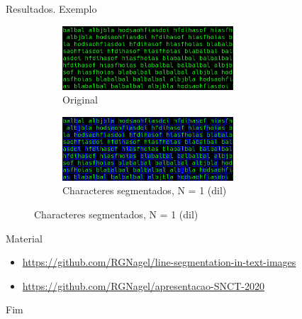 \documentclass{beamer}
\begin{document}
\begin{frame}[allowframebreaks]{Resultados. Exemplo}
\begin{figure}
    \centering
    \begin{subfigure}[]{\textwidth}
        \centering
        \includegraphics[width=0.7\textwidth]{images/terminal.png}
        \caption{Original}
    \end{subfigure}
    \begin{subfigure}[]{\textwidth}
        \centering
        \includegraphics[width=0.7\textwidth]{images/terminal_words_1_001.png}
        \caption{Characteres segmentados, N = 1 (dil)}
    \end{subfigure}
\end{figure}

\end{frame}

\begin{frame}{Material}

\begin{itemize}
    \item \small{\url{https://github.com/RGNagel/line-segmentation-in-text-images}}
    \item \small{\url{https://github.com/RGNagel/apresentacao-SNCT-2020}}
\end{itemize}

\end{frame}


\begin{frame}
\Huge{\centerline{Fim}}
\end{frame}

\end{document}
